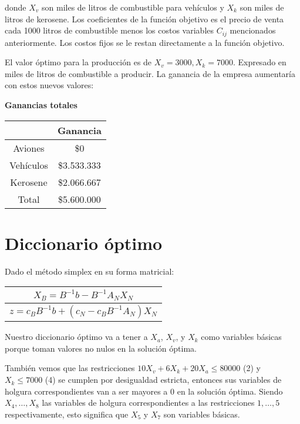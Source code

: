 \documentclass[10pt,a4paper]{article}
\begin{document}
donde $X_v$ son miles de litros de combustible para vehículos y  $X_k$ son miles de litros de kerosene. Los coeficientes de la función objetivo es el precio de venta cada 1000 litros de combustible menos los costos variables $C_{ij}$ mencionados anteriormente. Los costos fijos se le restan directamente a la función objetivo.

El valor óptimo para la producción es de $X_v = 3000, X_k = 7000$. Expresado en miles de litros de combustible a producir. La ganancia de la empresa aumentaría con estos nuevos valores:
\clearpage
\begin{center}
	\textbf{Ganancias totales}
	\vspace{3mm}
	
	\begin{tabular}{| c | c |}
		\hline
		&           Ganancia    \\
		\hline
		Aviones   & \$0  \\
		\hline
		Vehículos & \$3.533.333 \\
		\hline
		Kerosene  & \$2.066.667 \\
		\hline
		Total     & \$5.600.000\\
		\hline
	\end{tabular}
\end{center}

\section{} %
\section{} %

\section*{Diccionario óptimo}

Dado el método simplex en su forma matricial:
\begin{tabular}{c}
	$X_B = B^{-1}b - B^{-1}A_NX_N$ \\
	\hline
	$z = c_B B^{-1} b + (c_N - c_B B^{-1} A_N) X_N$
\end{tabular}

Nuestro diccionario óptimo va a tener a $X_a$, $X_v$, y $X_k$ como variables básicas porque toman valores no nulos en la solución óptima.

También vemos que las restricciones $10 X_v + 6 X_k + 20 X_a \leq 80000$ (2) y $X_k \leq 7000$ (4) se cumplen por desigualdad estricta, entonces sus variables de holgura correspondientes van a ser mayores a 0 en la solución óptima.
Siendo $X_4, \dots, X_8$ las variables de holgura correspondientes a las restricciones $1, \dots, 5$ respectivamente, esto significa que $X_5$ y $X_7$ son variables básicas.
\end{document}
